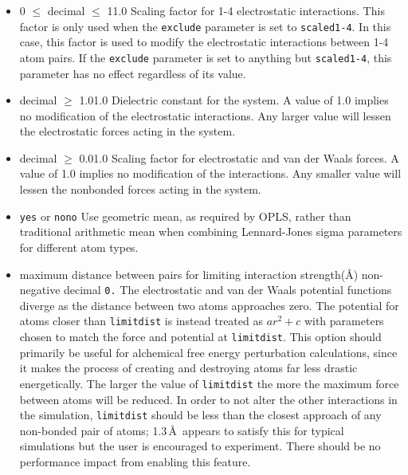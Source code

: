 \begin{itemize}
\item
{}
{0 $\leq$ decimal $\leq$ 1}{1.0}
{Scaling factor for 1-4 electrostatic interactions.
This factor is only used when the
{\tt exclude} parameter is set to {\tt scaled1-4}.  In this case, this
factor is used to modify the electrostatic interactions between 1-4 atom
pairs.  If the {\tt exclude} parameter is set to anything but 
{\tt scaled1-4}, this parameter has no effect regardless of its value.}

\item
{}
{decimal $\geq$ 1.0}{1.0}
{Dielectric constant for the system.  A value of 1.0 implies no modification
of the electrostatic interactions.  Any larger value will lessen the
electrostatic forces acting in the system.}

\item
{}
{decimal $\geq$ 0.0}{1.0}
{Scaling factor for electrostatic and van der Waals forces.
A value of 1.0 implies no modification of the interactions.
Any smaller value will lessen the
nonbonded forces acting in the system.}

\item
{}
{{\tt yes} or {\tt no}}{{\tt no}}
{Use geometric mean, as required by  OPLS, rather than
traditional arithmetic mean when combining Lennard-Jones sigma parameters
for different atom types.}

\item
{}
{maximum distance between pairs for limiting interaction strength(\AA)}
{non-negative decimal}
{{\tt 0.}}
{
The electrostatic and van der Waals potential functions diverge
as the distance between two atoms approaches zero.
The potential for atoms closer than {\tt limitdist} is instead
treated as $a r^2 + c$ with parameters chosen to match the
force and potential at {\tt limitdist}.
This option should primarily be useful for alchemical free energy
perturbation calculations, since it makes the process of creating
and destroying atoms far less drastic energetically.
The larger the value of {\tt limitdist} the more the maximum force
between atoms will be reduced.
In order to not alter the other interactions in the simulation,
{\tt limitdist} should be less than the closest approach
of any non-bonded pair of atoms; 1.3\,\AA\ appears to satisfy this
for typical simulations but the user is encouraged to experiment.
There should be no performance impact from enabling this feature.
}


\end{itemize}
